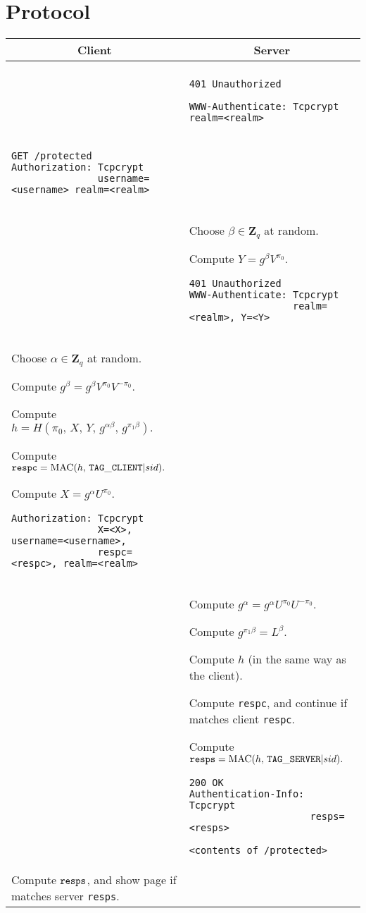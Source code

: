 \documentclass[10pt]{article}
\begin{document}
\section{Protocol}

\begin{tabular}{p{9.82cm} | p{9.82cm}}
\multicolumn{1}{c}{\bf Client} & \multicolumn{1}{c}{\bf Server} \\
\hline
\vspace{0.06cm}{\tt GET /protected} \\

& 
{\tt 401 Unauthorized}

{\tt WWW-Authenticate: Tcpcrypt realm=<realm>}
\\


\begin{verbatim}
GET /protected
Authorization: Tcpcrypt 
               username=<username> realm=<realm>
\end{verbatim} \\

& Choose $\beta \in \mathbf{Z}_q$ at random.

Compute $Y=g^\beta V^{\pi_0}.$

\begin{verbatim}
401 Unauthorized
WWW-Authenticate: Tcpcrypt 
                  realm=<realm>, Y=<Y>
\end{verbatim} \\

Choose $\alpha \in \mathbf{Z}_q$ at random.

Compute $g^\beta = g^\beta V^{\pi_0} V^{-\pi_0}.$

Compute $h = H(\pi_0,\, X,\, Y,\, g^{\alpha \beta},\, g^{\pi_1 \beta}).$

Compute ${\tt respc} = \operatorname{MAC}(h,\, {\tt TAG\_CLIENT} | sid).$

Compute $X=g^\alpha U^{\pi_0}.$

\begin{verbatim}
Authorization: Tcpcrypt 
               X=<X>, username=<username>,
               respc=<respc>, realm=<realm>
\end{verbatim}

& \\

& Compute $g^\alpha = g^\alpha U^{\pi_0} U^{-\pi_0}.$

Compute $g^{\pi_1 \beta} = L^\beta.$

Compute $h$ (in the same way as the client).

Compute {\tt respc}, and continue if matches client {\tt respc}.

Compute ${\tt resps} = \operatorname{MAC}(h,\, {\tt TAG\_SERVER} | sid).$
\begin{verbatim}
200 OK
Authentication-Info: Tcpcrypt 
                     resps=<resps>

<contents of /protected>
\end{verbatim} \\

Compute ${\tt resps}$, and show page if matches server {\tt resps}.
\end{tabular}
\end{document}

